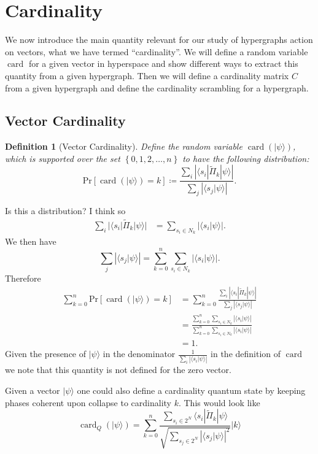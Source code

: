 \documentclass{article}
\newcommand{\ket}[1]{|#1\rangle}
\newcommand{\bra}[1]{\langle #1|}
\newcommand{\braket}[2]{\langle #1|#2\rangle}
\newcommand{\parens}[1]{\left( #1 \right)}
\newcommand{\abs}[1]{\left| #1 \right|}
\newcommand{\set}[1]{\left\{ #1 \right\}}
\newcommand{\prob}[1]{\text{Pr}\left[ #1 \right]}
\DeclareMathOperator{\card}{card}
\newcommand{\cardi}[1]{\card \parens{ #1 }}
\newcommand{\fullProj}{\widetilde{\Pi}}
\newcommand{\dual}[1]{\bra{s_{#1}}}
\newtheorem{defn}{Definition}
\begin{document}
\section{Cardinality} \label{sec:cardinality}
We now introduce the main quantity relevant for our study of hypergraphs action on vectors, what we have termed ``cardinality''. We will define a random variable $\card$ for a given vector in hyperspace and show different ways to extract this quantity from a given hypergraph. Then we will define a cardinality matrix $C$ from a given hypergraph and define the cardinality scrambling for a hypergraph. 

\subsection{Vector Cardinality}
\begin{defn}[Vector Cardinality]
    Define the random variable $\cardi{\ket{\psi}}$, which is supported over the set $\set{0, 1, 2, \ldots, n}$ to have the following distribution:
    \begin{equation}
        \prob{\cardi{\ket{\psi}} = k} \coloneqq \frac{\sum_{i} \abs{\dual{i} \fullProj_k \ket{\psi} }}{\sum_j \abs{\braket{s_j}{\psi}}}.
    \end{equation}
\end{defn}
Is this a distribution? I think so
\begin{align}
    \sum_i |\dual{i} \fullProj_k \ket{\psi} | &= \sum_{s_i \in N_k} \abs{\braket{s_i}{\psi}}.
\end{align}
We then have
\begin{equation}
    \sum_j \abs{\braket{s_j}{\psi}} = \sum_{k=0}^n \sum_{s_i \in N_k} \abs{\braket{s_i}{\psi}}.
\end{equation}
Therefore
\begin{align}
    \sum_{k=0}^n \prob{\cardi{\ket{\psi}} = k} &= \sum_{k=0}^n \frac{\sum_{i} \abs{\dual{i} \fullProj_k \ket{\psi} }}{\sum_j \abs{\braket{s_j}{\psi}}} \\
    &= \frac{\sum_{k=0}^n \sum_{s_i \in N_k} \abs{\braket{s_i}{\psi}} }{\sum_{k=0}^n \sum_{s_i \in N_k} \abs{\braket{s_i}{\psi}}} \\
    &= 1.
\end{align}
Given the presence of $\ket{\psi}$ in the denominator $\frac{1}{\sum_i \abs{\braket{s_i}{\psi}}}$ in the definition of $\card$ we note that this quantity is not defined for the zero vector. 

Given a vector $\ket{\psi}$ one could also define a cardinality quantum state by keeping phases coherent upon collapse to cardinality $k$. This would look like
\begin{equation}
    \card_Q\parens{\ket{\psi}} = \sum_{k=0}^n \frac{\sum_{s_i \in 2^N} \dual{i} \fullProj_k \ket{\psi}  }{\sqrt{\sum_{s_j \in 2^N} \abs{\braket{s_j}{\psi}}^2}} \ket{k}
\end{equation}
\end{document}
